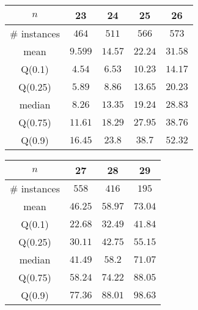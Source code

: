\begin{tabular}{c|cccc} 
\hline 
$n$ & 23 & 24 & 25 & 26 \tabularnewline 
\hline 
\hline 
\# instances & $464$ & $511$ & $566$ & $573$ \tabularnewline 
mean & $9.599$ & $14.57$ & $22.24$ & $31.58$ \tabularnewline 
Q(0.1) & $4.54$ & $6.53$ & $10.23$ & $14.17$ \tabularnewline 
Q(0.25) & $5.89$ & $8.86$ & $13.65$ & $20.23$ \tabularnewline 
median & $8.26$ & $13.35$ & $19.24$ & $28.83$ \tabularnewline 
Q(0.75) & $11.61$ & $18.29$ & $27.95$ & $38.76$ \tabularnewline 
Q(0.9) & $16.45$ & $23.8$ & $38.7$ & $52.32$ \tabularnewline 
\hline 
\end{tabular} 
\medskip{} 

\begin{tabular}{c|ccc} 
\hline 
$n$ & 27 & 28 & 29 \tabularnewline 
\hline 
\hline 
\# instances & $558$ & $416$ & $195$ \tabularnewline 
mean & $46.25$ & $58.97$ & $73.04$ \tabularnewline 
Q(0.1) & $22.68$ & $32.49$ & $41.84$ \tabularnewline 
Q(0.25) & $30.11$ & $42.75$ & $55.15$ \tabularnewline 
median & $41.49$ & $58.2$ & $71.07$ \tabularnewline 
Q(0.75) & $58.24$ & $74.22$ & $88.05$ \tabularnewline 
Q(0.9) & $77.36$ & $88.01$ & $98.63$ \tabularnewline 
\hline 
\end{tabular} 
\medskip{} 

